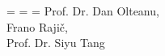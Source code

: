 \documentclass[12pt]{article}
\begin{document}
\showboxdepth=\maxdimen
\showboxbreadth=\maxdimen
{}=\vbox{
\fontsize{10}{12}\sffamily
Prof. Dr. Dan Olteanu, \\Frano Raji\v{c}, \\Prof. Dr. Siyu Tang
}
\end{document}
